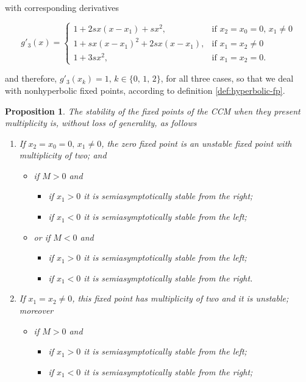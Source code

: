 \documentclass[10pt,twoside,titlepage]{book}
\numberwithin{equation}{chapter}
\numberwithin{figure}{chapter}
\numberwithin{table}{chapter}
\theoremstyle{plain}%
\newtheorem{prop}[thm]{Proposition}
\theoremstyle{definition}
\theoremstyle{remark}
\begin{document}
with corresponding derivatives

\begin{equation}
	g'_3(x)=
	\begin{cases}
		1 + 2sx(x-x_1)+sx^2,			&\text{if } x_2=x_0=0,\,x_1\neq0\\
		1 + sx(x-x_1)^2+2sx(x-x_1), 	&\text{if } x_1=x_2\neq0\\
		1 + 3sx^2,						&\text{if } x_1=x_2=0.
	\end{cases}
\end{equation}

and therefore, $g'_3(x_k)=1,\,k\in\{0,\,1,\,2\}$, for all three cases, so that we deal with nonhyperbolic fixed points, according to definition \ref{def:hyperbolic-fp}.

\begin{prop}
	The stability of the fixed points of the CCM when they present multiplicity is, without loss of generality, as follows
	\begin{enumerate}
		\item If $x_2=x_0=0,\,x_1\neq0$, the zero fixed point is an unstable fixed point with multiplicity of two; and
		\begin{itemize}
			\item if $M>0$ and
			\begin{itemize}
				\item if $x_1>0$ it is semiasymptotically stable from the right;
				\item if $x_1<0$ it is semiasymptotically stable from the left;
			\end{itemize}
			\item or if $M<0$ and
			\begin{itemize}
				\item if $x_1>0$ it is semiasymptotically stable from the left;
				\item if $x_1<0$ it is semiasymptotically stable from the right.
			\end{itemize}
		\end{itemize}
		\item If $x_1=x_2\neq0$, this fixed point has multiplicity of two and it is \emph{unstable}; moreover
		\begin{itemize}
			\item if $M>0$ and
			\begin{itemize}
				\item if $x_1>0$ it is semiasymptotically stable from the left;
				\item if $x_1<0$ it is semiasymptotically stable from the right;

\end{itemize}
\end{itemize}
\end{enumerate}
\end{prop}
\end{document}
